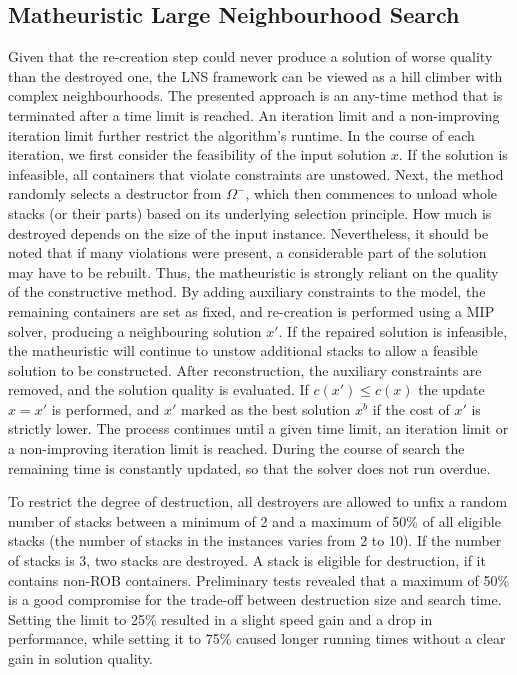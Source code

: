 \documentclass[preprint,11pt,3p]{elsarticle}
\begin{document}
\subsection{Matheuristic Large Neighbourhood Search}
Given that the re-creation step could never produce a solution of worse quality than the destroyed one, the LNS framework can be viewed as a hill climber with complex neighbourhoods. The presented approach is an any-time method that is terminated after a time limit is reached. An iteration limit and a non-improving iteration limit further restrict the algorithm's runtime. In the course of each iteration, we first consider the feasibility of the input solution $x$. If the solution is infeasible, all containers that violate constraints are unstowed. Next, the method randomly selects a destructor from $\Omega^{-}$, which then commences to unload whole stacks (or their parts) based on its underlying selection principle. How much is destroyed depends on the size of the input instance. Nevertheless, it should be noted that if many violations were present, a considerable part of the solution may have to be rebuilt. Thus, the matheuristic is strongly reliant on the quality of the constructive method. By adding auxiliary constraints to the model, the remaining containers are set as fixed, and re-creation is performed using a MIP solver, producing a neighbouring solution $x'$. If the repaired solution is infeasible, the matheuristic will continue to unstow additional stacks to allow a feasible solution to be constructed. After reconstruction, the auxiliary constraints are removed, and the solution quality is evaluated. If $c(x') \leq c(x)$ the update $x = x'$ is performed, and $x'$ marked as the best solution $x^b$ if the cost of $x'$ is strictly lower. The process continues until a given time limit, an iteration limit or a non-improving iteration limit is reached. During the course of search the remaining time is constantly updated, so that the solver does not run overdue.

To restrict the degree of destruction, all destroyers are allowed to unfix a random number of stacks between a minimum of 2 and a maximum of 50\% of all eligible stacks (the number of stacks in the instances varies from 2 to 10). If the number of stacks is 3, two stacks are destroyed. A stack is eligible for destruction, if it contains non-ROB containers. Preliminary tests revealed that a maximum of 50\% is a good compromise for the trade-off between destruction size and search time. Setting the limit to 25\% resulted in a slight speed gain and a drop in performance, while setting it to 75\% caused longer running times without a clear gain in solution quality.
\end{document}
